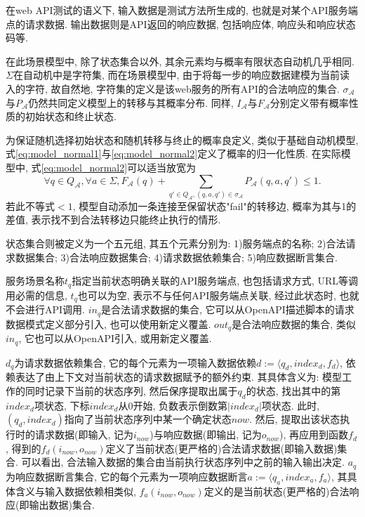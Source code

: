         在web API测试的语义下, 输入数据是测试方法所生成的, 也就是对某个API服务端点的请求数据. 输出数据则是API返回的响应数据, 包括响应体, 响应头和响应状态码等.
        
        在此场景模型中, 除了状态集合以外, 其余元素均与概率有限状态自动机几乎相同. $\Sigma$在自动机中是字符集, 而在场景模型中, 由于将每一步的响应数据建模为当前读入的字符, 故自然地, 字符集的定义是该web服务的所有API的合法响应的集合. $\sigma_{\mathcal{A}}$与$P_{\mathcal{A}}$仍然共同定义模型上的转移与其概率分布. 同样, $I_{\mathcal{A}}$与$F_{\mathcal{A}}$分别定义带有概率性质的初始状态和终止状态.
        
        为保证随机选择初始状态和随机转移与终止的概率良定义, 类似于基础自动机模型, 式\ref{eq:model_normal1}与\ref{eq:model_normal2}定义了概率的归一化性质. 在实际模型中, 式\ref{eq:model_normal2}可以适当放宽为
        \begin{equation}
            \label{eq:model_normal2_relax}
            \forall q \in Q_{\mathcal{A}}, \forall a \in \Sigma, F_{\mathcal{A}}(q) + \sum_{q' \in Q_{\mathcal{A}}, (q,a,q') \in \sigma_{\mathcal{A}}} P_{\mathcal{A}}(q,a,q') \leq 1.
        \end{equation}
        若此不等式$< 1$, 模型自动添加一条连接至保留状态"fail"的转移边, 概率为其与1的差值, 表示找不到合法转移边只能终止执行的情形.
        
        状态集合则被定义为一个五元组, 其五个元素分别为: 1)服务端点的名称; 2)合法请求数据集合; 3)合法响应数据集合; 4)请求数据依赖集合; 5)响应数据断言集合.
        
        服务场景名称$t_q$指定当前状态明确关联的API服务端点, 也包括请求方式, URL等调用必需的信息, $t_q$也可以为空, 表示不与任何API服务端点关联, 经过此状态时, 也就不会进行API调用. $in_q$是合法请求数据的集合, 它可以从OpenAPI描述脚本的请求数据模式定义部分引入, 也可以使用新定义覆盖. $out_q$是合法响应数据的集合, 类似$in_q$, 它也可以从OpenAPI引入, 或用新定义覆盖.
        
        $d_q$为请求数据依赖集合, 它的每个元素为一项输入数据依赖$d := \langle q_d, index_d, f_d \rangle$, 依赖表达了由上下文对当前状态的请求数据赋予的额外约束. 其具体含义为: 模型工作的同时记录下当前的状态序列, 然后保序提取出属于$q_d$的状态, 找出其中的第$index_d$项状态, 下标$index_d$从0开始, 负数表示倒数第$|index_d|$项状态. 此时, $(q_d, index_d)$指向了当前状态序列中某一个确定状态$now$. 然后, 提取出该状态执行时的请求数据(即输入, 记为$i_{now}$)与响应数据(即输出, 记为$o_{now}$), 再应用到函数$f_d$, 得到的$f_d(i_{now}, o_{now})$定义了当前状态(更严格的)合法请求数据(即输入数据)集合. 可以看出, 合法输入数据的集合由当前执行状态序列中之前的输入输出决定. $a_q$为响应数据断言集合, 它的每个元素为一项响应数据断言$a := \langle q_a, index_a, f_a\rangle$, 其具体含义与输入数据依赖相类似, $f_a(i_{now}, o_{now})$定义的是当前状态(更严格的)合法响应(即输出数据)集合.
        

